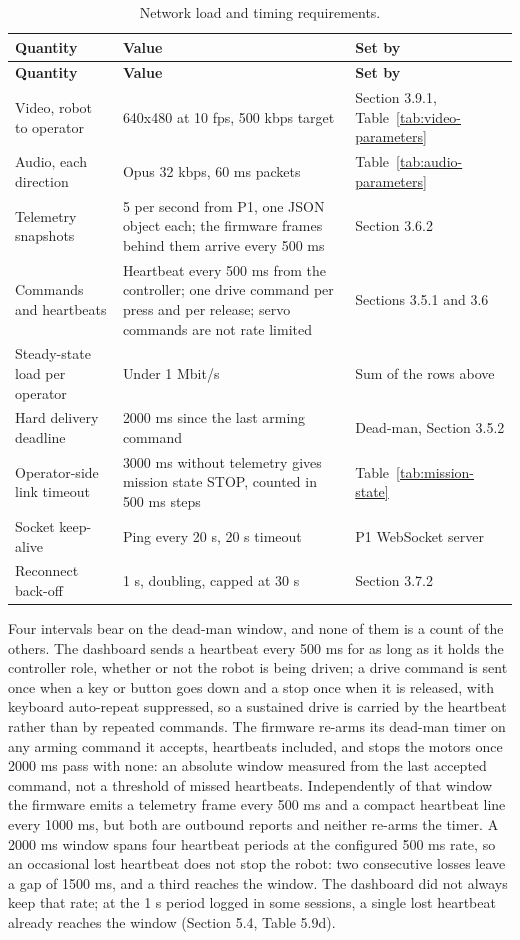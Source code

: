 \begin{center}
\begin{longtable}{|p{5cm}|p{4cm}|p{4cm}|}
\caption{Network load and timing requirements.}
\label{tab:network-load} \\
\hline
\textbf{Quantity} & \textbf{Value} & \textbf{Set by} \\
\hline
\endfirsthead
\hline
\textbf{Quantity} & \textbf{Value} & \textbf{Set by} \\
\hline
\endhead
Video, robot to operator & 640x480 at 10 fps, 500 kbps target & Section 3.9.1, Table~\ref{tab:video-parameters} \\
\hline
Audio, each direction & Opus 32 kbps, 60 ms packets & Table~\ref{tab:audio-parameters} \\
\hline
Telemetry snapshots & 5 per second from P1, one JSON object each; the firmware frames behind them arrive every 500 ms & Section 3.6.2 \\
\hline
Commands and heartbeats & Heartbeat every 500 ms from the controller; one drive command per press and per release; servo commands are not rate limited & Sections 3.5.1 and 3.6 \\
\hline
Steady-state load per operator & Under 1 Mbit/s & Sum of the rows above \\
\hline
Hard delivery deadline & 2000 ms since the last arming command & Dead-man, Section 3.5.2 \\
\hline
Operator-side link timeout & 3000 ms without telemetry gives mission state STOP, counted in 500 ms steps & Table~\ref{tab:mission-state} \\
\hline
Socket keep-alive & Ping every 20 s, 20 s timeout & P1 WebSocket server \\
\hline
Reconnect back-off & 1 s, doubling, capped at 30 s & Section 3.7.2 \\
\hline
\end{longtable}
\end{center}

Four intervals bear on the dead-man window, and none of them is a count of the others. The dashboard sends a heartbeat every 500 ms for as long as it holds the controller role, whether or not the robot is being driven; a drive command is sent once when a key or button goes down and a stop once when it is released, with keyboard auto-repeat suppressed, so a sustained drive is carried by the heartbeat rather than by repeated commands. The firmware re-arms its dead-man timer on any arming command it accepts, heartbeats included, and stops the motors once 2000 ms pass with none: an absolute window measured from the last accepted command, not a threshold of missed heartbeats. Independently of that window the firmware emits a telemetry frame every 500 ms and a compact heartbeat line every 1000 ms, but both are outbound reports and neither re-arms the timer. A 2000 ms window spans four heartbeat periods at the configured 500 ms rate, so an occasional lost heartbeat does not stop the robot: two consecutive losses leave a gap of 1500 ms, and a third reaches the window. The dashboard did not always keep that rate; at the 1 s period logged in some sessions, a single lost heartbeat already reaches the window (Section 5.4, Table 5.9d).

